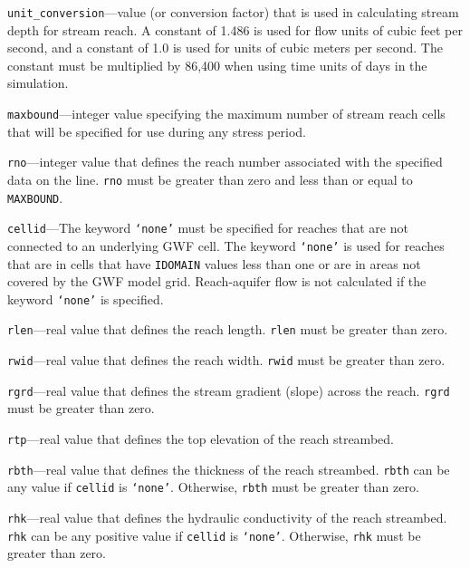 \item \texttt{unit\_conversion}---value (or conversion factor) that is used in calculating stream depth for stream reach. A constant of 1.486 is used for flow units of cubic feet per second, and a constant of 1.0 is used for units of cubic meters per second. The constant must be multiplied by 86,400 when using time units of days in the simulation.

\item \texttt{maxbound}---integer value specifying the maximum number of stream reach cells that will be specified for use during any stress period.

\item \texttt{rno}---integer value that defines the reach number associated with the specified data on the line. \texttt{rno} must be greater than zero and less than or equal to \texttt{MAXBOUND}.

\item \texttt{cellid}---The keyword \texttt{`none'} must be specified for reaches that are not connected to an underlying GWF cell. The keyword \texttt{`none'} is used for reaches that are in cells that have \texttt{IDOMAIN} values less than one or are in areas not covered by the GWF model grid. Reach-aquifer flow is not calculated if the keyword \texttt{`none'} is specified.

\item \texttt{rlen}---real value that defines the reach length. \texttt{rlen} must be greater than zero.

\item \texttt{rwid}---real value that defines the reach width. \texttt{rwid} must be greater than zero.

\item \texttt{rgrd}---real value that defines the stream gradient (slope) across the reach. \texttt{rgrd} must be greater than zero.

\item \texttt{rtp}---real value that defines the top elevation of the reach streambed.

\item \texttt{rbth}---real value that defines the thickness of the reach streambed. \texttt{rbth} can be any value if \texttt{cellid} is \texttt{`none'}. Otherwise, \texttt{rbth} must be greater than zero.

\item \texttt{rhk}---real value that defines the hydraulic conductivity of the reach streambed. \texttt{rhk} can be any positive value if \texttt{cellid} is \texttt{`none'}. Otherwise, \texttt{rhk} must be greater than zero.

